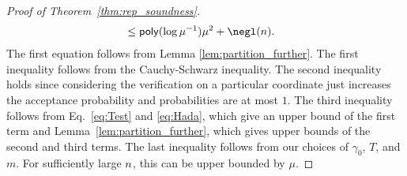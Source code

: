 \begin{proof}[Proof of Theorem~\ref{thm:rep_soundness}]
\begin{align*}
    & \leq \mathsf{poly}(\log \mu^{-1}) \mu^{2}+\negl(\secpar). 
\end{align*}
The first equation follows from Lemma \ref{lem:partition_further}. The first inequality follows from the Cauchy-Schwarz inequality.
 The second inequality holds since considering the verification on a particular coordinate just increases the acceptance probability and probabilities are at most $1$.
The third inequality follows from Eq.~\ref{eq:Test} and \ref{eq:Hada}, which give an upper bound of the first term and Lemma~\ref{lem:partition_further}, which gives upper bounds of the second and third terms.
The last inequality follows from our choices of $\gamma_0$, $T$, and $m$.
For sufficiently large $n$,  this can be upper bounded by $\mu$.
\end{proof}

